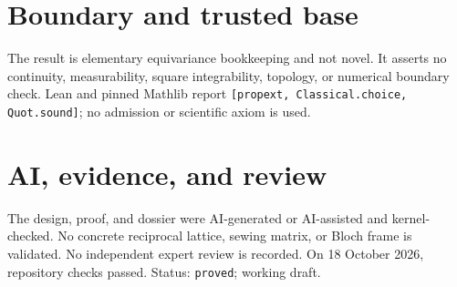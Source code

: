 \documentclass[11pt]{article}
\begin{document}
\section{Boundary and trusted base}
The result is elementary equivariance bookkeeping and not novel. It asserts no
continuity, measurability, square integrability, topology, or numerical boundary check.
Lean and pinned Mathlib report \texttt{[propext, Classical.choice, Quot.sound]}; no
admission or scientific axiom is used.

\section{AI, evidence, and review}
The design, proof, and dossier were AI-generated or AI-assisted and kernel-checked. No
concrete reciprocal lattice, sewing matrix, or Bloch frame is validated. No independent
expert review is recorded. On 18 October 2026, repository checks passed. Status:
\texttt{proved}; working draft.
\end{document}
